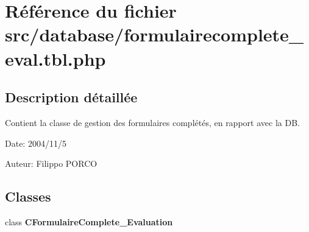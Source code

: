 \section{Référence du fichier src/database/formulairecomplete\_\-eval.tbl.php}
\label{formulairecomplete__eval_8tbl_8php}


\subsection{Description détaillée}
Contient la classe de gestion des formulaires complétés, en rapport avec la DB. 

\begin{Desc}
\item[Date:]2004/11/5\end{Desc}
\begin{Desc}
\item[Auteur:]Filippo PORCO \end{Desc}


\subsection*{Classes}
\begin{CompactItemize}
\item 
class \textbf{CFormulaireComplete\_\-Evaluation}
\end{CompactItemize}
